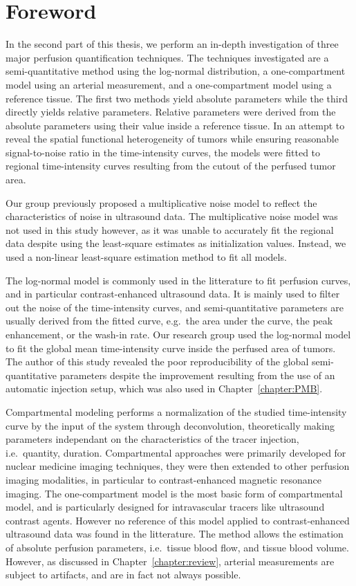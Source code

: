 \chapter*{Foreword}
In the second part of this thesis, we perform an in-depth investigation of three major perfusion quantification techniques.
The techniques investigated are a semi-quantitative method using the log-normal distribution, a one-compartment model using an arterial measurement, and a one-compartment model using a reference tissue. 
The first two methods yield absolute parameters while the third directly yields relative parameters.
Relative parameters were derived from the absolute parameters using their value inside a reference tissue.
In an attempt to reveal the spatial functional heterogeneity of tumors while ensuring reasonable signal-to-noise ratio in the time-intensity curves, the models were fitted to regional time-intensity curves resulting from the cutout of the perfused tumor area. 

Our group previously proposed a multiplicative noise model to reflect the characteristics of noise in ultrasound data.
The multiplicative noise model was not used in this study however, as it was unable to accurately fit the regional data despite using the least-square estimates as initialization values. 
Instead, we used a non-linear least-square estimation method to fit all models.

The log-normal model is commonly used in the litterature to fit perfusion curves, and in particular contrast-enhanced ultrasound data.
It is mainly used to filter out the noise of the time-intensity curves, and semi-quantitative parameters are usually derived from the fitted curve, e.g.~the area under the curve, the peak enhancement, or the wash-in rate. 
Our research group used the log-normal model to fit the global mean time-intensity curve inside the perfused area of tumors.
The author of this study revealed the poor reproducibility of the global semi-quantitative parameters despite the improvement resulting from the use of an automatic injection setup, which was also used in Chapter~\ref{chapter:PMB}.

Compartmental modeling performs a normalization of the studied time-intensity curve by the input of the system through deconvolution, theoretically making parameters independant on the characteristics of the tracer injection, i.e.~quantity, duration.
Compartmental approaches were primarily developed for nuclear medicine imaging techniques, they were then extended to other perfusion imaging modalities, in particular to contrast-enhanced magnetic resonance imaging.
The one-compartment model is the most basic form of compartmental model, and is particularly designed for intravascular tracers like ultrasound contrast agents. 
However no reference of this model applied to contrast-enhanced ultrasound data was found in the litterature.
The method allows the estimation of absolute perfusion parameters, i.e.~tissue blood flow, and tissue blood volume.
However, as discussed in Chapter~\ref{chapter:review}, arterial measurements are subject to artifacts, and are in fact not always possible.

